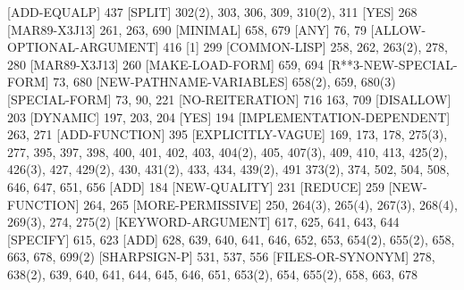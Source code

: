 [ADD-EQUALP] {\footnotesize 437}
[SPLIT] {\footnotesize 302(2), 303, 306, 309, 310(2), 311}
[YES] {\footnotesize 268}
[MAR89-X3J13] {\footnotesize 261, 263, 690}
[MINIMAL] {\footnotesize 658, 679}
[ANY] {\footnotesize 76, 79}
[ALLOW-OPTIONAL-ARGUMENT] {\footnotesize 416}
[1] {\footnotesize 299}
[COMMON-LISP] {\footnotesize 258, 262, 263(2), 278, 280}
[MAR89-X3J13] {\footnotesize 260}
[MAKE-LOAD-FORM] {\footnotesize 659, 694}
[R**3-NEW-SPECIAL-FORM] {\footnotesize 73, 680}
[NEW-PATHNAME-VARIABLES] {\footnotesize 658(2), 659, 680(3)}
[SPECIAL-FORM] {\footnotesize 73, 90, 221}
[NO-REITERATION] {\footnotesize 716}
 {\footnotesize 163, 709}
[DISALLOW] {\footnotesize 203}
[DYNAMIC] {\footnotesize 197, 203, 204}
[YES] {\footnotesize 194}
[IMPLEMENTATION-DEPENDENT] {\footnotesize 263, 271}
[ADD-FUNCTION] {\footnotesize 395}
[EXPLICITLY-VAGUE] {\footnotesize 169, 173, 178, 275(3), 277, 395, 397,
           398, 400, 401, 402, 403, 404(2), 405, 407(3), 409, 410, 413, 425(2), 426(3), 427, 
           429(2), 430, 431(2), 433, 434, 439(2), 491}
 {\footnotesize 373(2), 374, 502, 504, 508, 646, 647, 651, 656}
[ADD] {\footnotesize 184}
[NEW-QUALITY] {\footnotesize 231}
[REDUCE] {\footnotesize 259}
[NEW-FUNCTION] {\footnotesize 264, 265}
[MORE-PERMISSIVE] {\footnotesize 250, 264(3), 265(4), 267(3), 268(4), 
               269(3), 274, 275(2)}
[KEYWORD-ARGUMENT] {\footnotesize 617, 625, 641, 643, 644}
[SPECIFY] {\footnotesize 615, 623}
[ADD] {\footnotesize 628, 639, 640, 641, 646, 652, 653, 654(2), 655(2), 658, 
            663, 678, 699(2)}
[SHARPSIGN-P] {\footnotesize 531, 537, 556}
[FILES-OR-SYNONYM] {\footnotesize 278, 638(2), 639, 640, 641, 644, 645, 646, 651, 653(2),
           654, 655(2), 658, 663, 678}
